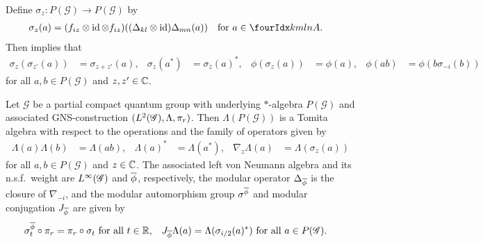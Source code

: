 Define $\sigma_{z} \colon P(\mathscr{G}) \to P(\mathscr{G})$
by
\begin{align*}
\sigma_{z}(a) &= (f_{iz} \otimes \id \otimes f_{iz})((\Delta_{kl}
\otimes \id)\Delta_{mn}(a)) \quad \text{for } a\in \Gr{A}{k}{l}{m}{n}.
\end{align*}
Then \cite[Theorem 3.49]{DCT1} implies that
\begin{align} \label{eq:alg-mod-aut}
 \sigma_{z}(\sigma_{z'}(a)) &= \sigma_{z+z'}(a), &
 \sigma_{z}(a^{*}) &= \sigma_{\overline{z}}(a)^{*}, &
\phi(\sigma_{z}(a)) &= \phi(a), & \phi(ab) &= \phi(b\sigma_{-i}(b))
\end{align}
for all $a,b\in P(\mathscr{G})$ and $z,z'\in \mathbb{C}$. 
\begin{Prop} \label{prop:tomita}
  Let $\mathscr{G}$ be a partial compact quantum group with underlying
  $*$-algebra $P(\mathscr{G})$ and associated GNS-construction
  $(L^{2}(\mathscr{G}),\Lambda,\pi_{r})$. Then 
  $\Lambda(P(\mathscr{G}))$ is a Tomita algebra with
  respect to the operations and the family of operators given by
  \begin{align*}
    \Lambda(a)\Lambda(b)&=\Lambda(ab), & \Lambda(a)^{*}&=
  \Lambda(a^{*}), &
\nabla_{z}\Lambda(a)&=\Lambda(\sigma_{z}(a))
  \end{align*}
  for all $a,b\in P(\mathscr{G})$ and $z\in \mathbb{C}$.  The associated left
  von Neumann algebra and its n.s.f.\ weight are $L^{\infty}(\mathscr{G})$ and
  $\overline{\phi}$, respectively, the modular operator $\Delta_{\overline{\phi}}$ is
  the closure of $\nabla_{-i}$, and the   modular automorphism group $\sigma^{\overline{\phi}}$
  and modular conjugation $J_{\overline{\phi}}$ are given by
  \begin{align*}
    \sigma^{\overline{\phi}}_{t} \circ \pi_{r} &= \pi_{r} \circ \sigma_{t}
    \text{ for all } t\in \mathbb{R}, & J_{\overline{\phi}}
    \Lambda(a)&=\Lambda(\sigma_{i/2}(a)^{*}) \text{ for all } a\in
    P(\mathscr{G}).
  \end{align*}
\end{Prop}
